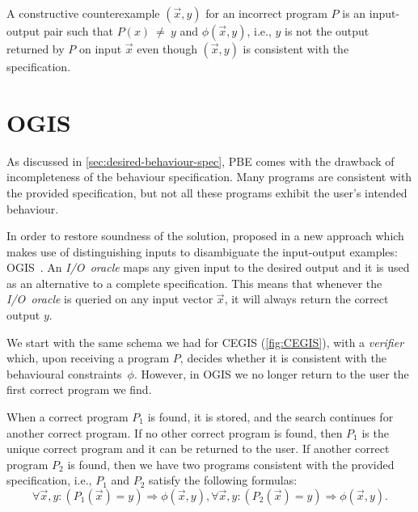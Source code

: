 \begin{definition}
A constructive counterexample \((\vec{x}, y)\) for an incorrect program \(P\) is an input-output pair such that {{\(P(x)~\neq~y\)}} and \(\phi(\vec{x}, y)\), i.e., \(y\) is not the output returned by \(P\) on input \(\vec{x}\) even though \((\vec{x}, y)\) is consistent with the specification.
\end{definition}

\section{\acl{OGIS}} \label{sec:ogis}
As discussed in \autoref{sec:desired-behaviour-spec}, \ac{PBE} comes with the drawback of incompleteness of the behaviour specification. Many programs are consistent with the provided specification, but not all these programs exhibit the user's intended behaviour.

In order to restore soundness of the solution, \citeauthor{DBLP:conf/icse/JhaGST10} proposed in \citeyear{DBLP:conf/icse/JhaGST10} a new approach which makes use of distinguishing inputs to disambiguate the input-output examples: \acf{OGIS}~\cite{DBLP:conf/icse/JhaGST10}.
An \textit{I/O~oracle} maps any given input to the desired output and it is used as an alternative to a complete specification. This means that whenever the \textit{I/O~oracle} is queried on any input vector \(\vec{x}\), it will always return the correct output \(y\).

We start with the same schema we had for \ac{CEGIS} (\autoref{fig:CEGIS}),  with a \textit{verifier} which, upon receiving a program \(P\), decides whether it is consistent with the behavioural constraints~\(\phi\). However, in \ac{OGIS} we no longer return to the user the first correct program we find.

When a correct program \(P_1\) is found, it is stored, and the search continues for another correct program. If no other correct program is found, then \(P_1\) is the unique correct program and it can be returned to the user. If another correct program \(P_2\) is found, then we have two programs consistent with the provided specification, i.e., \(P_1\) and \(P_2\) satisfy the following formulas:
%
\begin{subequations}
\begin{equation}
  \forall \vec{x}, y : (P_1(\vec{x}) = y) \Rightarrow \phi(\vec{x}, y),
\end{equation}
\begin{equation}
  \forall \vec{x}, y : (P_2(\vec{x}) = y) \Rightarrow \phi(\vec{x}, y).
\end{equation}
\end{subequations}

